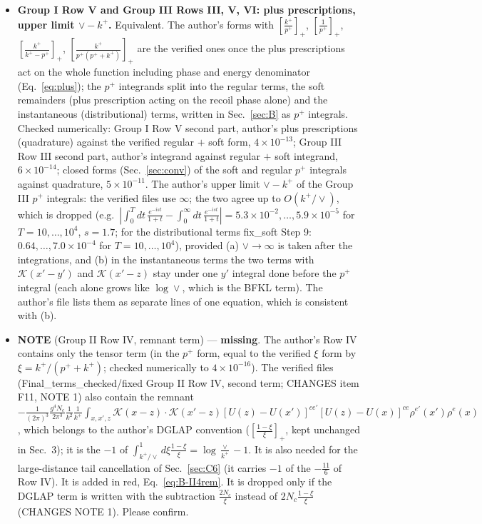 \begin{itemize}
\item[A4] \textbf{Group I Row V and Group III Rows III, V, VI: plus prescriptions, upper limit $\vee-k^{+}$.} Equivalent. The author's forms with $[\frac{k^{+}}{p^{+}}]_{+}$, $[\frac{1}{p^{+}}]_{+}$, $[\frac{k^{+}}{k^{+}-p^{+}}]_{+}$, $[\frac{k^{+}}{p^{+}(p^{+}+k^{+})}]_{+}$ are the verified ones once the plus prescriptions act on the whole function including phase and energy denominator (Eq.~\eqref{eq:plus}); the $p^{+}$ integrands split into the regular terms, the soft remainders (plus prescription acting on the recoil phase alone) and the instantaneous (distributional) terms, written in Sec.~\ref{sec:B} as $p^{+}$ integrals. Checked numerically: Group I Row V second part, author's plus prescriptions (quadrature) against the verified regular $+$ soft form, $4\times10^{-13}$; Group III Row III second part, author's integrand against regular $+$ soft integrand, $6\times10^{-14}$; closed forms (Sec.~\ref{sec:conv}) of the soft and regular $p^{+}$ integrals against quadrature, $5\times10^{-11}$. The author's upper limit $\vee-k^{+}$ of the Group III $p^{+}$ integrals: the verified files use $\infty$; the two agree up to $O(k^{+}/\vee)$, which is dropped (e.g.\ $|\int_{0}^{T}dt\,\frac{e^{-ist}}{1+t}-\int_{0}^{\infty}dt\,\frac{e^{-ist}}{1+t}|=5.3\times10^{-2},\dots,5.9\times10^{-5}$ for $T=10,\dots,10^{4}$, $s=1.7$; for the distributional terms fix\_soft Step 9: $0.64,\dots,7.0\times10^{-4}$ for $T=10,\dots,10^{4}$), provided (a) $\vee\to\infty$ is taken after the integrations, and (b) in the instantaneous terms the two terms with $\mathcal{K}(x'-y')$ and $\mathcal{K}(x'-z)$ stay under one $y'$ integral done before the $p^{+}$ integral (each alone grows like $\log\vee$, which is the BFKL term). The author's file lists them as separate lines of one equation, which is consistent with (b).
\item[A5] {\color{red}\textbf{NOTE} (Group II Row IV, remnant term) --- \textbf{missing}. The author's Row IV contains only the tensor term (in the $p^{+}$ form, equal to the verified $\xi$ form by $\xi=k^{+}/(p^{+}+k^{+})$; checked numerically to $4\times10^{-16}$). The verified files (Final\_terms\_checked/fixed Group II Row IV, second term; CHANGES item F11, NOTE 1) also contain the remnant $-\frac{1}{(2\pi)^{3}}\frac{g^{4}N_{c}}{2\pi^{3}}\frac{1}{k^{2}}\frac{1}{k^{+}}\int_{x,x',z}\mathcal{K}(x-z)\cdot\mathcal{K}(x'-z)[U(z)-U(x')]^{ce'}[U(z)-U(x)]^{ce}\rho^{e'}(x')\rho^{e}(x)$, which belongs to the author's DGLAP convention ($[\frac{1-\xi}{\xi}]_{+}$, kept unchanged in Sec.~3); it is the $-1$ of $\int_{k^{+}/\vee}^{1}d\xi\frac{1-\xi}{\xi}=\log\frac{\vee}{k^{+}}-1$. It is also needed for the large-distance tail cancellation of Sec.~\ref{sec:C6} (it carries $-1$ of the $-\frac{11}{6}$ of Row IV). It is added in red, Eq.~\eqref{eq:B-II4rem}. It is dropped only if the DGLAP term is written with the subtraction $\frac{2N_{c}}{\xi}$ instead of $2N_{c}\frac{1-\xi}{\xi}$ (CHANGES NOTE 1). Please confirm.}

\end{itemize}
